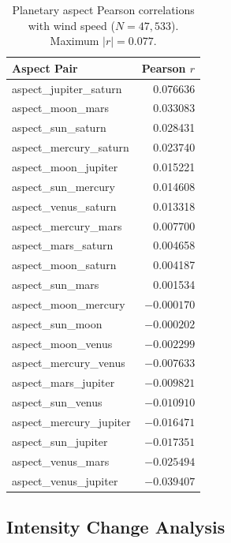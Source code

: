 \documentclass[12pt,a4paper]{article}
\begin{document}
    \begin{table}[H]
    \centering
    \caption{Planetary aspect Pearson correlations with wind speed
    ($N = 47{,}533$). Maximum $|r| = 0.077$.}
    \label{tab:aspects}
    \begin{tabular}{lr}
        \toprule
        Aspect Pair & Pearson $r$ \\
        \midrule
        aspect\_jupiter\_saturn  &  0.076636 \\
        aspect\_moon\_mars       &  0.033083 \\
        aspect\_sun\_saturn      &  0.028431 \\
        aspect\_mercury\_saturn  &  0.023740 \\
        aspect\_moon\_jupiter    &  0.015221 \\
        aspect\_sun\_mercury     &  0.014608 \\
        aspect\_venus\_saturn    &  0.013318 \\
        aspect\_mercury\_mars    &  0.007700 \\
        aspect\_mars\_saturn     &  0.004658 \\
        aspect\_moon\_saturn     &  0.004187 \\
        aspect\_sun\_mars        &  0.001534 \\
        aspect\_moon\_mercury    & $-0.000170$ \\
        aspect\_sun\_moon        & $-0.000202$ \\
        aspect\_moon\_venus      & $-0.002299$ \\
        aspect\_mercury\_venus   & $-0.007633$ \\
        aspect\_mars\_jupiter    & $-0.009821$ \\
        aspect\_sun\_venus       & $-0.010910$ \\
        aspect\_mercury\_jupiter & $-0.016471$ \\
        aspect\_sun\_jupiter     & $-0.017351$ \\
        aspect\_venus\_mars      & $-0.025494$ \\
        aspect\_venus\_jupiter   & $-0.039407$ \\
        \bottomrule
    \end{tabular}
    \end{table}

    \subsection{Intensity Change Analysis}
\end{document}

